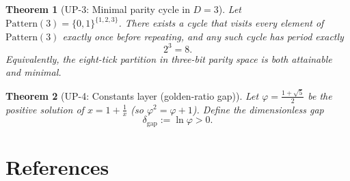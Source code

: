 \documentclass[11pt]{article}
\theoremstyle{plain}
\newtheorem{theorem}{Theorem}
\theoremstyle{definition}
\theoremstyle{remark}
\begin{document}
\begin{theorem}[UP-3: Minimal parity cycle in \(D=3\)]
Let \(\mathrm{Pattern}(3)=\{0,1\}^{\{1,2,3\}}\). There exists a cycle that visits every element of \(\mathrm{Pattern}(3)\) exactly once before repeating, and any such cycle has period exactly
\[
2^{3}=8.
\]
Equivalently, the eight-tick partition in three-bit parity space is both attainable and minimal.
\end{theorem}

\begin{theorem}[UP-4: Constants layer (golden-ratio gap)]
Let \(\varphi=\tfrac{1+\sqrt{5}}{2}\) be the positive solution of \(x=1+\tfrac{1}{x}\) (so \(\varphi^{2}=\varphi+1\)). Define the dimensionless gap
\[
\delta_{\mathrm{gap}}:=\ln\varphi>0.
\]
\end{theorem}
\section*{References}
\end{document}

